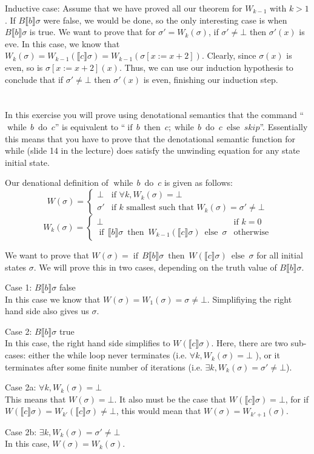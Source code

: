 \documentclass{article}
\newcommand{\problem}[1]
{\subsubsection*{} %
\vspace{-16pt} \section{} \vspace{-22pt} \qquad
#1%
\bigskip \bigskip
}
\newcommand{\while}[2]{\operatorname{while}\, #1\ \operatorname{do}\ #2}
\newcommand{\ifthen}[3]{\operatorname{if}\, #1
\ \operatorname{then}\ #2\ \operatorname{else}\ #3}
\newcommand{\denote}[1]{\llbracket #1 \rrbracket}
\begin{document}
Inductive case:
Assume that we have proved all our theorem for $W_{k-1}$ with $k > 1$.  If
$B\denote{b}\sigma$ were false, we would be done, so the only interesting case
is when $B\denote{b}\sigma$ is true.
We want to prove that for $\sigma' = W_k(\sigma)$, if $\sigma' \ne
\bot$ then $\sigma'(x)$ is eve. In this case, we know that $W_k(\sigma) =
W_{k-1}(\denote{c}\sigma) = W_{k-1}(\sigma[x := x + 2])$.
Clearly, since $\sigma(x)$ is even, so is $\sigma[x := x + 2](x)$.
Thus, we can use our induction hypothesis to conclude that if $\sigma' \ne \bot$
then $\sigma'(x)$ is even, finishing our induction step.

\problem{
In this exercise you will prove using denotational semantics that the command
``$\while{b}{c}$'' is equivalent to ``$\ifthen{b}{c;\while{b}{c}}{skip}$''.
Essentially this means that you have to prove that the denotational semantic
function for while (slide 14 in the lecture) does satisfy the unwinding equation
for any state initial state.
}

Our denational definition of $\while{b}{c}$ is given as follows:
\[
W(\sigma) = \begin{cases}
            \bot    &\text{if } \forall k, W_k(\sigma) = \bot \\
            \sigma' &\text{if $k$ smallest such that } W_k(\sigma) = \sigma' \ne
            \bot
            \end{cases}
\]
\[
W_k(\sigma) =
\begin{cases}
\bot & \text{if } k = 0 \\
\ifthen{\denote{b}\sigma}{W_{k-1}(\denote{c}\sigma)}{\sigma} &\text{otherwise}
\end{cases}
\]

We want to prove that $W(\sigma) =
\ifthen{B\denote{b}\sigma}{W(\denote{c}\sigma)}{\sigma}$ for all initial states
$\sigma$. We will prove this in two cases, depending on the truth value of
$B\denote{b}\sigma$.

Case 1: $B\denote{b}\sigma$ false \\
In this case we know that $W(\sigma) = W_1(\sigma) = \sigma \ne \bot$.
Simplifiying the right hand side also gives us $\sigma$.

Case 2:  $B\denote{b}\sigma$ true \\
In this case, the right hand side simplifies to $W(\denote{c}\sigma)$.
Here, there are two sub-cases: either the while loop never terminates (i.e.
$\forall k, W_k(\sigma) = \bot$ ), or it terminates after some finite number of
iterations (i.e. $\exists k, W_k(\sigma) = \sigma' \ne \bot$).

Case 2a: $\forall k, W_k(\sigma) = \bot$ \\
This means that $W(\sigma) = \bot$.  It also must be the case that
$W(\denote{c}\sigma) = \bot$, for if $W(\denote{c}\sigma) =
W_{k'}(\denote{c}\sigma) \ne \bot$, this would mean that $W(\sigma) =
W_{k'+1}(\sigma)$.

Case 2b: $\exists k, W_k(\sigma) = \sigma' \ne \bot$ \\
In this case, $W(\sigma) = W_k(\sigma)$.
\end{document}
